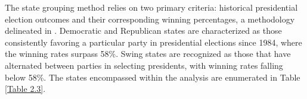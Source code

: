 The state grouping method relies on two primary criteria: historical presidential election outcomes and their corresponding winning percentages, a methodology delineated in \textcite{beachler2015presidential}. Democratic and Republican states are characterized as those consistently favoring a particular party in presidential elections since 1984, where the winning rates surpass 58\%. Swing states are recognized as those that have alternated between parties in selecting presidents, with winning rates falling below 58\%. The states encompassed within the analysis are enumerated in Table \ref{Table 2.3}.

